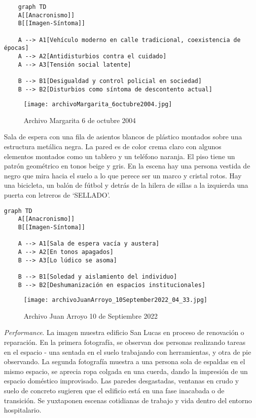 {\small
\singlespacing \begin{verbatim}
    graph TD
    A[[Anacronismo]]
    B[[Imagen-Síntoma]]

    A --> A1[Vehículo moderno en calle tradicional, coexistencia de épocas]
    A --> A2[Antidisturbios contra el cuidado]
    A --> A3[Tensión social latente]

    B --> B1[Desigualdad y control policial en sociedad]
    B --> B2[Disturbios como síntoma de descontento actual]
\end{verbatim}
\normalsize

\clearpage
\begin{figure}[h!]
    \centering
    \texttt{[image: archivoMargarita\_6octubre2004.jpg]}
    \caption{Archivo Margarita 6 de octubre 2004}
    \label{fig:archivoMargarita_6octubre2004}
\end{figure}

Sala de espera con una fila de asientos blancos de plástico montados sobre una estructura metálica negra. La pared es de color crema claro con algunos elementos montados como un tablero y un teléfono naranja. El piso tiene un patrón geométrico en tonos beige y gris. En la escena hay una persona vestida de negro que mira hacia el suelo a lo que perece ser un marco y cristal rotos. Hay una bicicleta, un balón de fútbol y detrás de la hilera de sillas a la izquierda una puerta con letreros de `SELLADO'.

\small
\singlespacing \begin{verbatim}
graph TD
    A[[Anacronismo]]
    B[[Imagen-Síntoma]]
    
    A --> A1[Sala de espera vacía y austera]
    A --> A2[En tonos apagados]
    B --> A3[Lo lúdico se asoma]
    
    B --> B1[Soledad y aislamiento del individuo]
    B --> B2[Deshumanización en espacios institucionales]
\end{verbatim}
\normalsize

\clearpage
\begin{figure}[h!]
    \centering
    \texttt{[image: archivoJuanArroyo\_10September2022\_04\_33.jpg]}
    \caption{Archivo Juan Arroyo 10 de Septiembre 2022}
    \label{fig:archivoJuanArroyo_10September2022_04_33}
\end{figure}

\textit{Performance}. La imagen muestra edificio San Lucas en proceso de renovación o reparación. En la primera fotografía, se observan dos personas realizando tareas en el espacio - una sentada en el suelo trabajando con herramientas, y otra de pie observando. La segunda fotografía muestra a una persona sola de espaldas en el mismo espacio, se aprecia ropa colgada en una cuerda, dando la impresión de un espacio doméstico improvisado. Las paredes desgastadas, ventanas en crudo y suelo de concreto sugieren que el edificio está en una fase inacabada o de transición. Se yuxtaponen  escenas cotidianas de trabajo y vida dentro del entorno hospitalario.

}
